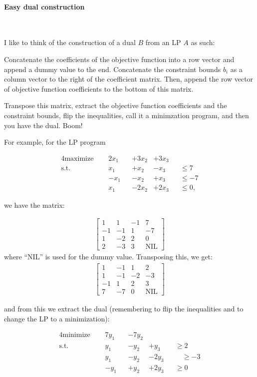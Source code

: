 \paragraph{Easy dual construction}~\smallskip

I like to think of the construction of a dual $B$ from an LP $A$ as such:

Concatenate the coefficients of the objective function into a row vector and
append a dummy value to the end. Concatenate the constraint bounds $b_i$ as a
column vector to the right of the coefficient matrix. Then, append the row
vector of objective function coefficients to the bottom of this matrix.

Transpose this matrix, extract the objective function coefficients and the
constraint bounds, flip the inequalities, call it a minimzation program, and
then you have the dual. Boom!

For example, for the LP program

\begin{alignat*}{4}
  \text{maximize } \quad& 2x_1 && +3x_2     &+ 3x_3 &&   \\[4pt]
  \text{s.t. }     \quad& x_1  && + x_2    &- x_3  &&\leq 7\\
                        & -x_1 && -x_2     &+x_3   &&\leq -7\\
                        & x_1  && -2x_2    &+2x_3  &&\leq 0,
\end{alignat*}

we have the matrix:

\begin{align}
  \left[
  \begin{matrix}
    1 & 1 & -1 & 7\\
    -1 & -1 & 1 & -7\\
    1 & -2 & 2 & 0\\
    2 & -3 & 3 & \text{NIL}
  \end{matrix}
  \right]
\end{align}
where ``NIL'' is used for the dummy value. Transposing this, we get:
\begin{align}
  \left[
  \begin{matrix}
     1 & -1 &  1 &  2 \\
     1 & -1 & -2 & -3 \\
    -1 &  1 &  2 &  3 \\
     7 & -7 &  0 & \text{NIL}
  \end{matrix}
  \right]
\end{align}

and from this we extract the dual (remembering to flip the inequalities and to
change the LP to a minimization):

\begin{alignat*}{4}
  \text{minimize } \quad& 7y_1 && -7y_2  &       &&   \\[4pt]
  \text{s.t. }     \quad& y_1  && -y_2   &+y_3   &&\geq 2\\
                        & y_1  && -y_2   &-2y_3  &&\quad \geq -3\\
                        & -y_1 && +y_2   &+2y_3  &&\geq 0
\end{alignat*}
